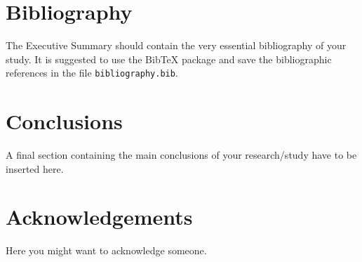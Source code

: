 \documentclass[11pt,a4paper,twocolumn]{article}
\begin{document}
\section{Bibliography}
\label{sec:bibliography}
The Executive Summary should contain the very essential bibliography of your study.
It is suggested to use the BibTeX package \cite{bibtex} and save the bibliographic references
in the file  \verb|bibliography.bib|.

\section{Conclusions}
A final section containing the main conclusions of your research/study have to be inserted here.

\section{Acknowledgements}
Here you might want to acknowledge someone.

\end{document}
